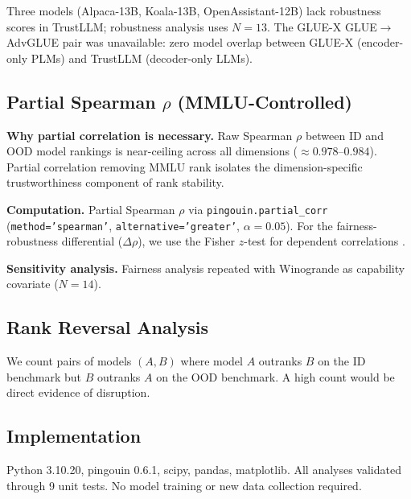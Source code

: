 Three models (Alpaca-13B, Koala-13B, OpenAssistant-12B) lack robustness scores in TrustLLM; robustness analysis uses $N=13$. The GLUE-X GLUE$\rightarrow$AdvGLUE pair was unavailable: zero model overlap between GLUE-X (encoder-only PLMs) and TrustLLM (decoder-only LLMs).

\subsection{Partial Spearman $\rho$ (MMLU-Controlled)}

\textbf{Why partial correlation is necessary.} Raw Spearman $\rho$ between ID and OOD model rankings is near-ceiling across all dimensions ($\approx 0.978$--$0.984$). Partial correlation removing MMLU rank isolates the dimension-specific trustworthiness component of rank stability.

\textbf{Computation.} Partial Spearman $\rho$ via \texttt{pingouin.partial\_corr} (\texttt{method='spearman'}, \texttt{alternative='greater'}, $\alpha=0.05$). For the fairness-robustness differential ($\Delta\rho$), we use the Fisher $z$-test for dependent correlations \citep{Meng1992Comparing}.

\textbf{Sensitivity analysis.} Fairness analysis repeated with Winogrande as capability covariate ($N=14$).

\subsection{Rank Reversal Analysis}

We count pairs of models $(A, B)$ where model $A$ outranks $B$ on the ID benchmark but $B$ outranks $A$ on the OOD benchmark. A high count would be direct evidence of disruption.

\subsection{Implementation}

Python 3.10.20, pingouin 0.6.1, scipy, pandas, matplotlib. All analyses validated through 9 unit tests. No model training or new data collection required.
